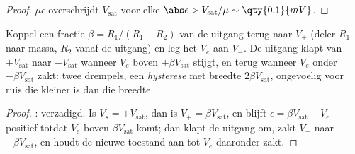 \begin{proof}
$\mu\epsilon$ overschrijdt $V_{\mathrm{sat}}$ voor elke $\abs\epsilon >
V_{\mathrm{sat}}/\mu \sim \qty{0.1}{mV}$.
\end{proof}

\begin{proposition}[Schmitttrigger]\label{prop:b1:operational-amplifier:schmitt}
Koppel een fractie $\beta = R_1/(R_1 + R_2)$ van de uitgang terug naar $V_+$
(deler $R_1$ naar massa, $R_2$ vanaf de uitgang) en leg het 
$V_e$ aan $V_-$. De uitgang klapt van $+V_{\mathrm{sat}}$ naar
$-V_{\mathrm{sat}}$ wanneer $V_e$ boven $+\beta V_{\mathrm{sat}}$ stijgt, en
terug wanneer $V_e$ onder $-\beta V_{\mathrm{sat}}$ zakt: twee drempels,
een \emph{hysterese} met breedte $2\beta V_{\mathrm{sat}}$, ongevoelig voor ruis
die kleiner is dan die breedte.
\end{proposition}

\begin{proof}
: verzadigd. Is $V_s = +V_{\mathrm{sat}}$, dan is $V_+ =
\beta V_{\mathrm{sat}}$, en blijft $\epsilon = \beta V_{\mathrm{sat}} - V_e$
positief totdat $V_e$ boven $\beta V_{\mathrm{sat}}$ komt; dan klapt de
uitgang om, zakt $V_+$ naar $-\beta V_{\mathrm{sat}}$, en houdt de nieuwe toestand
aan tot $V_e$ daaronder zakt.
\end{proof}

